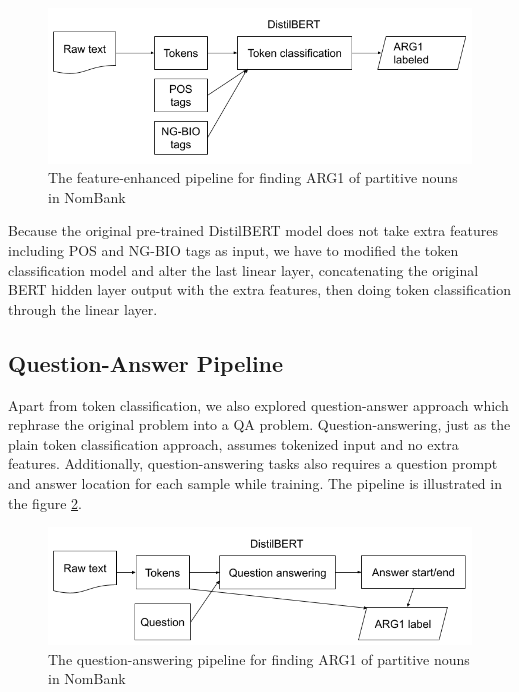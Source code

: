 \documentclass[11pt]{article}
\begin{document}
\begin{figure}[h]
  \centering
  \includegraphics[width=\linewidth]{assets/enhanced-arg1-pipeline.png}
  \caption{The feature-enhanced pipeline for finding ARG1 of partitive nouns in NomBank}
  \label{fig:enhanced-arg1-pipeline}
\end{figure}

Because the original pre-trained DistilBERT model does not take extra features including POS and NG-BIO tags as input, we have to modified the token classification model and alter the last linear layer, concatenating the original BERT hidden layer output with the extra features, then doing token classification through the linear layer.

\subsection{Question-Answer Pipeline}

Apart from token classification, we also explored question-answer approach which rephrase the original problem into a QA problem. Question-answering, just as the plain token classification approach, assumes tokenized input and no extra features. Additionally, question-answering tasks also requires a question prompt and answer location for each sample while training. The pipeline is illustrated in the figure \ref{fig:qa-arg1-pipeline}.

\begin{figure}[h]
  \centering
  \includegraphics[width=\linewidth]{assets/qa-arg1-pipeline.png}
  \caption{The question-answering pipeline for finding ARG1 of partitive nouns in NomBank}
  \label{fig:qa-arg1-pipeline}
\end{figure}
\end{document}

